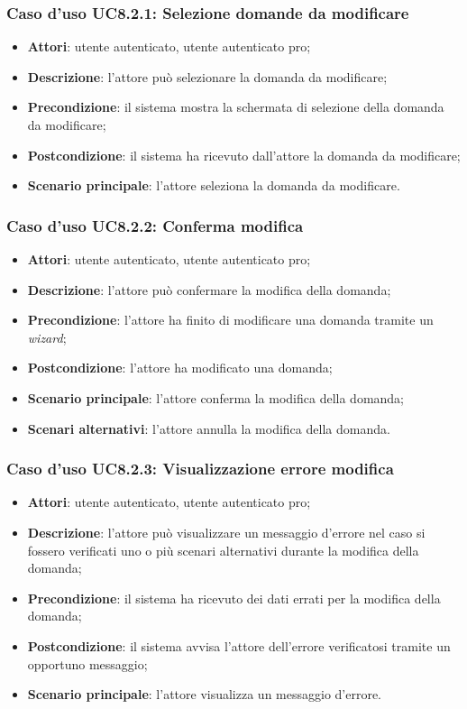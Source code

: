 		\subsubsection{Caso d'uso UC8.2.1: Selezione domande da modificare}
		\begin{itemize}
			\item \textbf{Attori}: utente autenticato, utente autenticato pro;
			\item \textbf{Descrizione}: l'attore può selezionare la domanda da modificare;
			\item \textbf{Precondizione}: il sistema mostra la schermata di selezione della domanda da modificare;
			\item \textbf{Postcondizione}: il sistema ha ricevuto dall'attore la domanda da modificare; 
			\item \textbf{Scenario principale}: l'attore seleziona la domanda da modificare.
			
		\end{itemize}

	\subsubsection{Caso d'uso UC8.2.2: Conferma modifica}
	\begin{itemize}
		\item
			\textbf{Attori}: utente autenticato, utente autenticato pro;
		\item
			\textbf{Descrizione}: l'attore può confermare la modifica della domanda;
		\item		
			\textbf{Precondizione}: l'attore ha finito di modificare una domanda tramite un \textit{wizard};
		\item
			\textbf{Postcondizione}: l'attore ha modificato una domanda;
		\item
			\textbf{Scenario principale}: l'attore conferma la modifica della domanda;		
		\item
	 		\textbf{Scenari alternativi}: l'attore annulla la modifica della domanda.
	\end{itemize}		
	\subsubsection{Caso d'uso UC8.2.3: Visualizzazione errore modifica}
	\begin{itemize}
		\item
			\textbf{Attori}: utente autenticato, utente autenticato pro;
		\item
			\textbf{Descrizione}: l'attore può visualizzare un messaggio d'errore nel caso si fossero verificati uno o più scenari alternativi durante la modifica della domanda;
		\item		
			\textbf{Precondizione}: il sistema ha ricevuto dei dati errati per la modifica della domanda;
		\item
			\textbf{Postcondizione}: il sistema avvisa l'attore dell'errore verificatosi tramite un opportuno messaggio;
		\item
			\textbf{Scenario principale}: l'attore visualizza un messaggio d'errore.	
	\end{itemize}
	
